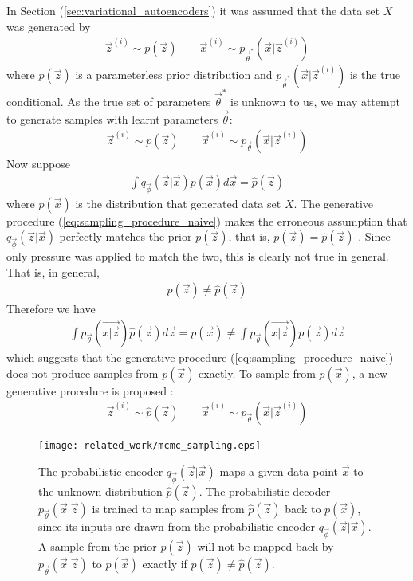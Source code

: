 In Section (\ref{sec:variational_autoencoders}) it was assumed that the data set $X$ was generated by
\begin{align}
\vec{z}^{(i)} \sim p(\vec{z}) \quad\quad \vec{x}^{(i)} \sim p_{\vec{\theta}^*}(\vec{x} | \vec{z}^{(i)})
\end{align}
where $p(\vec{z})$ is a parameterless prior distribution and $p_{\vec{\theta}^*}(\vec{x} | \vec{z}^{(i)})$ is the true conditional. As the true set of parameters $\vec{\theta}^*$ is unknown to us, we may attempt to generate samples with learnt parameters $\vec{\theta}$:
\begin{align}
\vec{z}^{(i)} \sim p(\vec{z}) \quad\quad \vec{x}^{(i)} \sim p_{\vec{\theta}}(\vec{x} | \vec{z}^{(i)})
\label{eq:sampling_procedure_naive}
\end{align}
Now suppose
\begin{align}
\int q_{\vec{\phi}}(\vec{z} | \vec{x}) p(\vec{x})d\vec{x} = \hat{p}(\vec{z})
\end{align}
where $p(\vec{x})$ is the distribution that generated data set $X$. The generative procedure (\ref{eq:sampling_procedure_naive}) makes the erroneous assumption that $q_{\vec{\phi}}(\vec{z} | \vec{x})$ perfectly matches the prior $p(\vec{z})$, that is, $p(\vec{z}) = \hat{p}(\vec{z})$ \cite{Creswell2016}. Since only pressure was applied to match the two, this is clearly not true in general. That is, in general,
\begin{align}
p(\vec{z}) \neq \hat{p}(\vec{z})
\end{align}
Therefore we have
\begin{align}
\int p_{\vec{\theta}}(\vec{x | \vec{z}}) \hat{p}(\vec{z}) d\vec{z} = p(\vec{x}) \neq \int p_{\vec{\theta}}(\vec{x | \vec{z}}) p(\vec{z}) d\vec{z}
\end{align}
which suggests that the generative procedure (\ref{eq:sampling_procedure_naive}) does not produce samples from $p(\vec{x})$ exactly. To sample from $p(\vec{x})$, a new generative procedure is proposed \cite{Creswell2016}:
\begin{align}
\vec{z}^{(i)} \sim \hat{p}(\vec{z}) \quad\quad \vec{x}^{(i)} \sim p_{\vec{\theta}}(\vec{x} | \vec{z}^{(i)})
\label{eq:updated_sampling_mcmc}
\end{align}

\begin{figure}[h!]
\centering
\captionsetup{justification=centering}
\texttt{[image: related\_work/mcmc\_sampling.eps]}
\caption{The probabilistic encoder $q_{\vec{\phi}}(\vec{z} | \vec{x})$ maps a given data point $\vec{x}$ to the unknown distribution $\hat{p}(\vec{z})$. The probabilistic decoder $p_{\vec{\theta}}(\vec{x} | \vec{z})$ is trained to map samples from $\hat{p}(\vec{z})$ back to $p(\vec{x})$, since its inputs are drawn from the probabilistic encoder $q_{\vec{\phi}}(\vec{z} | \vec{x})$. A sample from the prior $p(\vec{z})$ will not be mapped back by $p_{\vec{\theta}}(\vec{x} | \vec{z})$ to $p(\vec{x})$ exactly if $p(\vec{z}) \neq \hat{p}(\vec{z})$. \cite{Creswell2016}}
\label{fig:mcmc_sampling}
\end{figure}

